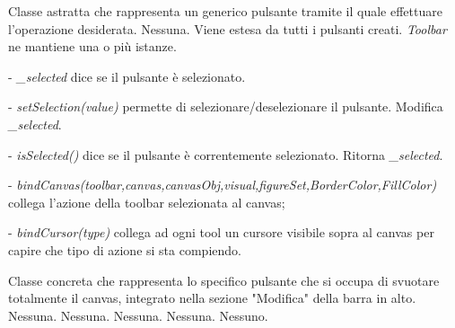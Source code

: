 Classe astratta che rappresenta un generico pulsante tramite il quale effettuare l'operazione desiderata.
Nessuna.
Viene estesa da tutti i pulsanti creati.
\textit{Toolbar} ne mantiene una o pi\` u istanze.
\begin{elencopuntato}[\subsubsecindent]
\item[-] \textit{{\_}selected} dice se il pulsante \`e selezionato.
\end{elencopuntato}
\begin{elencopuntato}[\subsubsecindent]
\item[-]  \textit{setSelection(value)} permette di selezionare/deselezionare il pulsante. Modifica \textit{{\_}selected}.
\item[-]  \textit{isSelected()} dice se il pulsante \`e correntemente selezionato. Ritorna \textit{{\_}selected}.
\item[-]  \textit{bindCanvas(toolbar,canvas,canvasObj,visual,figureSet,BorderColor,FillColor)} collega l'azione della toolbar selezionata al canvas;
\item[-]  \textit{bindCursor(type)} collega ad ogni tool un cursore visibile sopra al canvas per capire che tipo di azione si sta compiendo.
\end{elencopuntato}

Classe concreta che rappresenta lo specifico pulsante che si occupa di svuotare totalmente il canvas, integrato nella sezione "Modifica" della barra in alto.
Nessuna.
Nessuna.
Nessuna.
Nessuna.
Nessuno.

